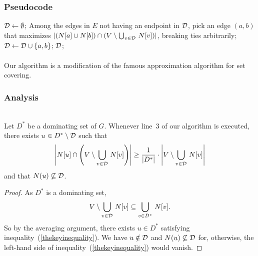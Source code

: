 \documentclass{beamer}
\begin{document}
\begin{frame}\frametitle{Pseudocode}
\begin{algorithmic}[1]
\STATE ${\cal D}\leftarrow \emptyset$;
  \STATE Among the edges in $E$ not having an endpoint in ${\cal D}$, pick
an edge $(a,b)$
that maximizes $|(N[a]\cup N[b])\cap (V\setminus \bigcup_{v\in {\cal D}}\,N[v])|$,
breaking ties arbitrarily;
  \STATE ${\cal D}\leftarrow {\cal D}\cup\{a,b\}$;
\ENDWHILE
\RETURN ${\cal D}$;\\
\ \\
Our algorithm is a modification of the famous approximation algorithm for set covering.
\end{algorithmic}
\end{frame}

\setcounter{footnote}{0}
\begin{frame}\frametitle{Analysis}
\begin{lemma}
\ \\ 
Let $D^*$ be a dominating set of $G$.  Whenever line~3 of our algorithm is executed,  there exists $u$ $\in D^*\setminus {\cal D}$ such that   
\begin{eqnarray}
\left|N[u]\cap \left(V\setminus \bigcup_{v\in {\cal D}}\,N[v]\right)\right|
\ge \frac{1}{|D^*|}
\cdot\left|V\setminus \bigcup_{v\in {\cal D}}\,N[v]\right|
\label{thekeyinequality}
\end{eqnarray}
and that $N(u)\not\subseteq {\cal D}$.
\end{lemma}
\begin{proof}
As $D^*$ is a dominating set,
{\footnotesize
$$
V\setminus \bigcup_{v\in {\cal D}}\,N[v]
\subseteq
\bigcup_{v\in D^*}\, N[v].$$
}
So by the averaging argument, there exists
$u\in D^*$ satisfying inequality~(\ref{thekeyinequality}).
We have
$u\notin {\cal D}$ and $N(u)\not\subseteq {\cal D}$
for, otherwise, the left-hand side of inequality~(\ref{thekeyinequality})
would vanish.
\end{proof}
\end{frame}
\end{document}
